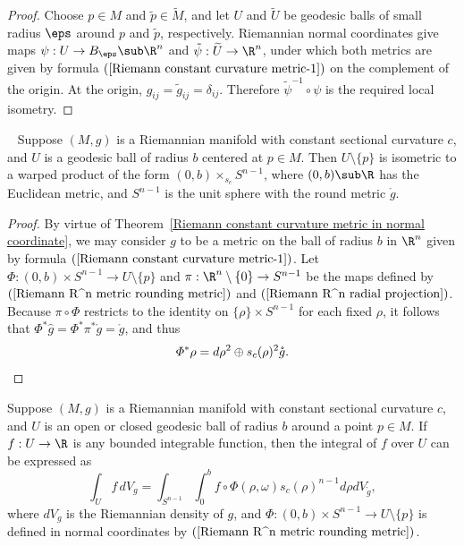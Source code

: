 \begin{proof}
Choose $p\in M$ and $\tilde{p}\in\widetilde{M}$, and let $U$ and $\widetilde{U}$ be geodesic balls of small radius $\eps$ around $p$ and $\tilde{p}$, respectively. Riemannian normal coordinates give maps $\psi:U\to B_{\eps}\sub\R^n$ and $\tilde{\psi}:\widetilde{U}\to\R^n$, under which both metrics are given by formula $(\ref{Riemann constant curvature metric-1})$ on the complement of the origin. At the origin, $g_{ij}=\tilde{g}_{ij}=\delta_{ij}$. Therefore $\tilde{\psi}^{-1}\circ\psi$ is the required local isometry.
\end{proof}
\begin{corollary}~\label{Riemann constant curvature metrics warped product}
Suppose $(M,g)$ is a Riemannian manifold with constant sectional curvature $c$, and $U$ is a geodesic ball of radius $b$ centered at $p\in M$. Then $U\setminus\{p\}$ is 
isometric to a warped product of the form $(0,b)\times_{s_c}S^{n-1}$, where $(0,b)\sub\R$ has the Euclidean metric, and $S^{n-1}$ is the unit sphere with the round 
metric $\mathring{g}$.
\end{corollary}
\begin{proof}
By virtue of Theorem~\ref{Riemann constant curvature metric in normal coordinate}, we may consider $g$ to be a metric on the ball of radius $b$ in $\R^n$ given by 
formula $(\ref{Riemann constant curvature metric-1})$. Let $\varPhi:(0,b)\times S^{n-1}\to U\setminus\{p\}$ and $\pi:\R^n\setminus\{0\}\to S^{n-1}$ be the maps defined 
by $(\ref{Riemann R^n metric rounding metric})$ and $(\ref{Riemann R^n radial projection})$. Because $\pi\circ\varPhi$ restricts to the identity on 
$\{\rho\}\times S^{n-1}$ for each fixed $\rho$, it follows that $\varPhi^*\hat{g}=\varPhi^*\pi^*\mathring{g}=\mathring{g}$, and thus
\begin{equation*}
\varPhi^*\rho=d\rho^2\oplus s_c(\rho)^2\mathring{g}.\qedhere
\end{equation*}
\end{proof}
\begin{corollary}
Suppose $(M,g)$ is a Riemannian manifold with constant sectional curvature $c$, and $U$ is an open or closed geodesic ball of radius $b$ around a point $p\in M$. If 
$f:U\to\R$ is any bounded integrable function, then the integral of $f$ over $U$ can be expressed as
\[\int_Uf\,dV_g=\int_{S^{n-1}}\int_0^bf\circ\varPhi(\rho,\omega)s_c(\rho)^{n-1}d\rho dV_{\mathring{g}},\]
where $dV_g$ is the Riemannian density of $g$, and $\varPhi:(0,b)\times S^{n-1}\to U\setminus\{p\}$ is defined in normal coordinates by $(\ref{Riemann R^n metric rounding metric})$.
\end{corollary}
